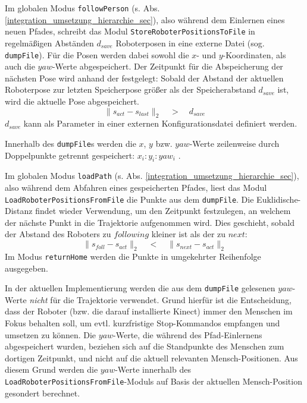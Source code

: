 Im globalen Modus \lstinline{followPerson} (s. Abs. \ref{integration_umsetzung_hierarchie_sec}), also während dem Einlernen eines neuen Pfades,
 schreibt das Modul \lstinline{StoreRoboterPositionsToFile} in regelmäßigen Abständen $d_{save}$ Roboterposen in eine externe Datei (sog. \lstinline{dumpFile}).
Für die Posen werden dabei sowohl die $x$- und $y$-Koordinaten, als auch die $yaw$-Werte abgespeichert.
Der Zeitpunkt für die Abspeicherung der nächsten Pose wird anhand der  festgelegt:
Sobald der Abstand der aktuellen Roboterpose zur letzten Speicherpose größer als der Speicherabstand $d_{save}$ ist, wird die aktuelle Pose abgespeichert.
\begin{equation}
	\| s_{act} - s_{last}\|_2 \quad > \quad d_{save}
\end{equation}
$d_{save}$ kann als Parameter in einer externen Konfigurationsdatei definiert werden.

Innerhalb des \lstinline{dumpFile}s werden die $x$, $y$ bzw. $yaw$-Werte zeilenweise durch Doppelpunkte getrennt gespeichert:
$x_i:y_i:yaw_i$
.

Im globalen Modus \lstinline{loadPath} (s. Abs. \ref{integration_umsetzung_hierarchie_sec}), also während dem Abfahren eines gespeicherten Pfades, liest das Modul \lstinline{LoadRoboterPositionsFromFile} die Punkte aus dem \lstinline{dumpFile}.
Die \gls{Euklidische-Distanz} findet wieder Verwendung, um den Zeitpunkt festzulegen, an welchem der nächste Punkt in die Trajektorie aufgenommen wird.
Dies geschieht, sobald der Abstand des Roboters zu $following$ kleiner ist als der zu $next$:
\begin{equation}
	\| s_{foll} - s_{act} \|_2 \quad < \quad \| s_{next} - s_{act} \|_2
\end{equation}
Im Modus \lstinline{returnHome} werden die Punkte in umgekehrter Reihenfolge ausgegeben.

In der aktuellen Implementierung werden die aus dem \lstinline{dumpFile} gelesenen $yaw$-Werte \emph{nicht} für die Trajektorie verwendet.
Grund hierfür ist die Entscheidung, dass der Roboter (bzw. die darauf installierte Kinect) immer den Menschen im Fokus behalten soll, um evtl. kurzfristige Stop-Kommandos empfangen und umsetzen zu können.
Die $yaw$-Werte, die während des Pfad-Einlernens abgespeichert wurden, beziehen sich auf die Standpunkte des Menschen zum dortigen Zeitpunkt, und nicht auf die aktuell relevanten Mensch-Positionen. 
Aus diesem Grund werden die $yaw$-Werte innerhalb des \lstinline{LoadRoboterPositionsFromFile}-Moduls auf Basis der aktuellen Mensch-Position gesondert berechnet.

